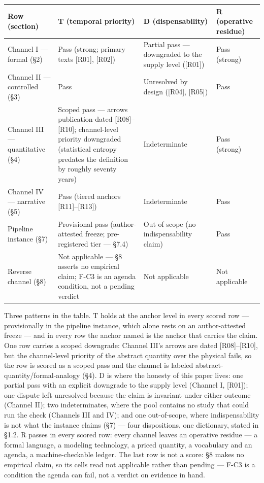 \documentclass[11pt,a4paper]{article}
\begin{document}
\begin{table}[htbp]
\centering
\footnotesize
\setlength{\tabcolsep}{3.5pt}
\renewcommand{\arraystretch}{1.18}
\begin{tabularx}{0.985\textwidth}{@{}>{\raggedright\arraybackslash}p{}>{\raggedright\arraybackslash}X>{\raggedright\arraybackslash}X>{\raggedright\arraybackslash}X@{}}
\toprule
\textbf{Row (section)} & \textbf{T (temporal priority)} & \textbf{D (dispensability)} & \textbf{R (operative residue)} \\
\midrule
Channel I — formal (§2) & Pass (strong; primary texts [R01], [R02]) & Partial pass — downgraded to the supply level ([R01]) & Pass (strong) \\
Channel II — controlled (§3) & Pass & Unresolved by design ([R04], [R05]) & Pass \\
Channel III — quantitative (§4) & Scoped pass — arrows publication-dated [R08]–[R10]; channel-level priority downgraded (statistical entropy predates the definition by roughly seventy years) & Indeterminate & Pass (strong) \\
Channel IV — narrative (§5) & Pass (tiered anchors [R11]–[R13]) & Indeterminate & Pass \\
Pipeline instance (§7) & Provisional pass (author-attested freeze; pre-registered tier — §7.4) & Out of scope (no indispensability claim) & Pass \\
Reverse channel (§8) & Not applicable — §8 asserts no empirical claim; F-C3 is an agenda condition, not a pending verdict & Not applicable & Not applicable \\
\bottomrule
\end{tabularx}
\end{table}

Three patterns in the table. T holds at the anchor level in every scored row — provisionally in the pipeline instance, which alone rests on an author-attested freeze — and in every row the anchor named is the anchor that carries the claim. One row carries a scoped downgrade: Channel III's arrows are dated [R08]–[R10], but the channel-level priority of the abstract quantity over the physical fails, so the row is scored as a scoped pass and the channel is labeled abstract-quantity/formal-analogy (§4). D is where the honesty of this paper lives: one partial pass with an explicit downgrade to the supply level (Channel I, [R01]); one dispute left unresolved because the claim is invariant under either outcome (Channel II); two indeterminates, where the pool contains no study that could run the check (Channels III and IV); and one out-of-scope, where indispensability is not what the instance claims (§7) — four dispositions, one dictionary, stated in §1.2. R passes in every scored row: every channel leaves an operative residue — a formal language, a modeling technology, a priced quantity, a vocabulary and an agenda, a machine-checkable ledger. The last row is not a score: §8 makes no empirical claim, so its cells read not applicable rather than pending — F-C3 is a condition the agenda can fail, not a verdict on evidence in hand.
\end{document}

